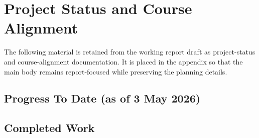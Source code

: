 \documentclass[11pt,a4paper]{article}
\begin{document}
\section{Project Status and Course Alignment}

The following material is retained from the working report draft as project-status and course-alignment documentation. It is placed in the appendix so that the main body remains report-focused while preserving the planning details.

\subsection*{Progress To Date (as of 3 May 2026)}

\subsection*{Completed Work}
\end{document}
